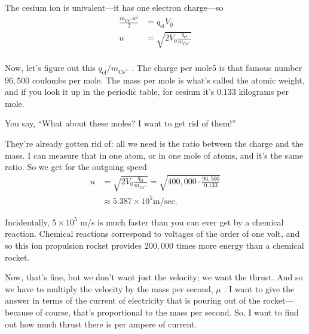\documentclass[11pt,oneside]{article}
\begin{document}
The cesium ion is univalent---it has one electron charge---so 
\begin{equation*} \begin{aligned} \frac{m_{\text{Cs}^+}u^2}{2} &= q_\text{el}V_0\\[1ex] u &= \sqrt{2V_0\frac{q_\text{el}}{m_{\text{Cs}^+}}}\\[1ex] \end{aligned} \tag{3.22}
\label{Eq:TIPS:3:22} \end{equation*}
\par

Now, let's figure out this \(q_\text{el}/m_{\text{Cs}^+}\) . The charge per mole5 is that famous number \(96,\!500\) coulombs per mole. The mass per mole is what's called the atomic weight, and if you look it up in the periodic table, for cesium it's \(0.133\) kilograms per mole.\par

You say, ``What about these moles? I want to get rid of them!''\par

They're already gotten rid of: all we need is the ratio between the charge and the mass. I can measure that in one atom, or in one mole of atoms, and it's the same ratio. So we get for the outgoing speed 
\begin{equation*} \begin{aligned} u &= \sqrt{2V_0\frac{q_\text{el}}{m_{\text{Cs}^+}}} = \sqrt{400,\!000 \cdot \frac{96,\!500}{0.133}}\\[1ex] &\approx 5.387 \times 10^5 \text{m/sec}. \end{aligned} \tag{3.23}
\label{Eq:TIPS:3:23} \end{equation*}
\par

Incidentally, \(5 \times 10^5\) m/s is much faster than you can ever get by a chemical reaction. Chemical reactions correspond to voltages of the order of one volt, and so this ion propulsion rocket provides \(200,\!000\) times more energy than a chemical rocket.\par

Now, that's fine, but we don't want just the velocity; we want the thrust. And so we have to multiply the velocity by the mass per second, \(\mu\) . I want to give the answer in terms of the current of electricity that is pouring out of the rocket---because of course, that's proportional to the mass per second. So, I want to find out how much thrust there is per ampere of current.\par
\end{document}
